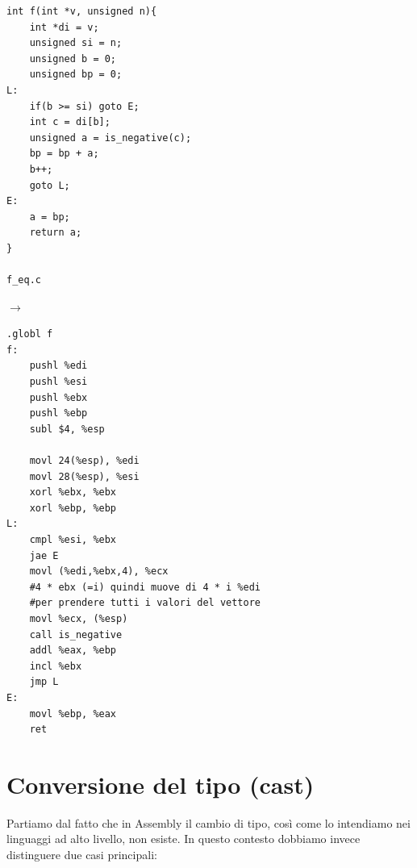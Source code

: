 \vspace{1cm}

\noindent
\begin{minipage}{0.45\textwidth}
\begin{verbatim}
int f(int *v, unsigned n){
    int *di = v;
    unsigned si = n;
    unsigned b = 0;
    unsigned bp = 0;
L:
    if(b >= si) goto E;
    int c = di[b];
    unsigned a = is_negative(c);
    bp = bp + a;
    b++;
    goto L;
E:
    a = bp; 
    return a;
}

f_eq.c
\end{verbatim}
\end{minipage}
\hfill
$\longrightarrow$
\hfill
\begin{minipage}{0.45\textwidth}
\begin{verbatim}
.globl f
f:
    pushl %edi
    pushl %esi
    pushl %ebx
    pushl %ebp
    subl $4, %esp

    movl 24(%esp), %edi
    movl 28(%esp), %esi
    xorl %ebx, %ebx
    xorl %ebp, %ebp
L:
    cmpl %esi, %ebx
    jae E
    movl (%edi,%ebx,4), %ecx 
    #4 * ebx (=i) quindi muove di 4 * i %edi 
    #per prendere tutti i valori del vettore
    movl %ecx, (%esp)
    call is_negative
    addl %eax, %ebp
    incl %ebx
    jmp L
E:
    movl %ebp, %eax
    ret
\end{verbatim}
\end{minipage}

\newpage
\section{Conversione del tipo (cast)}
Partiamo dal fatto che in Assembly il cambio di tipo, così come lo intendiamo nei linguaggi ad alto livello, non esiste. In questo contesto dobbiamo invece distinguere due casi principali:

